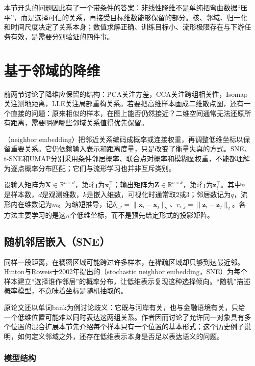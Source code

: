 本节开头的问题因此有了一个带条件的答案：非线性降维不是单纯把弯曲数据“压平”，而是选择可信的关系，再接受目标维数能够保留的部分。核、邻域、归一化和时间尺度决定了关系本身；数值求解正确、训练目标小、流形极限存在与下游任务有效，是需要分别验证的四件事。

\section{基于邻域的降维}
\label{sec:dim-neighbors}

前两节讨论了降维应保留的结构：PCA关注方差，CCA关注跨组相关性，Isomap关注测地距离，LLE关注局部重构关系。若要把高维样本画成二维散点图，还有一个直接的问题：原来相似的样本，在图上能否仍然接近？二维空间通常无法还原所有距离，需要明确哪些邻域关系值得优先保留。

（neighbor embedding）把邻近关系编码成概率或连接权重，再调整低维坐标以保留重要关系。它仍依赖输入表示和距离度量，只是改变了衡量失真的方式。SNE、t-SNE和UMAP分别采用条件邻居概率、联合点对概率和模糊图权重，不能都理解为逐点概率分布匹配；它们与流形学习也并非互斥类别。

设输入矩阵为$\bm{X}\in\mathbb{R}^{n\times d}$，第$i$行为$\bm{x}_i^\top$；输出矩阵为$\bm{Z}\in\mathbb{R}^{n\times k}$，第$i$行为$\bm{z}_i^\top$。其中$n$是样本数，$d$是观测维数，$k$是嵌入维数，可视化时通常取$2$或$3$；邻居数记为$q$，流形内在维数记为$m$。为缩短推导，记$\delta_{i,j}=\lVert\bm{x}_i-\bm{x}_j\rVert_2$、$r_{i,j}=\lVert\bm{z}_i-\bm{z}_j\rVert_2$。各方法主要学习的是这$n$个低维坐标，而不是预先给定形式的投影矩阵。

\subsection{随机邻居嵌入（SNE）}
\label{sec:dim-sne}

同样一段距离，在稠密区域可能跨过许多样本，在稀疏区域却只够到达最近邻。Hinton与Roweis于2002年提出的（stochastic neighbor embedding，SNE）为每个样本建立“选择谁作邻居”的概率分布，让低维表示复现这种选择倾向。“随机”描述概率模型，不意味着坐标是随机抽取的。

原论文还以单词bank为例讨论歧义：它既与河岸有关，也与金融语境有关，只给一个低维位置可能难以同时表达这两组关系。作者因而讨论了允许同一对象具有多个位置的混合扩展本节先介绍每个样本只有一个位置的基本形式；这个历史例子说明，如何定义邻域之外，还存在低维表示本身是否足以表达语义的问题。

\subsubsection{模型结构}

